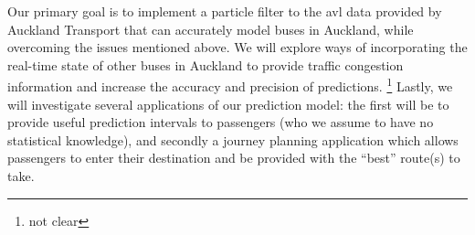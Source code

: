 \documentclass[12pt,a4paper]{article}
\newcommand{\pf}{particle filter}
\begin{document}
Our primary goal is to implement a \pf{} to the \gls{avl} data provided by Auckland Transport
that can accurately model buses in Auckland,
while overcoming the issues mentioned above.
We will explore ways of incorporating the real-time state of other buses in Auckland
to provide traffic congestion information and increase the accuracy and precision of predictions.
\footnote{not clear}
Lastly, we will investigate several applications of our prediction model:
the first will be to provide useful prediction intervals to passengers
(who we assume to have no statistical knowledge),
and secondly a journey planning application which allows passengers to enter their destination
and be provided with the ``best'' route(s) to take.














\end{document}
